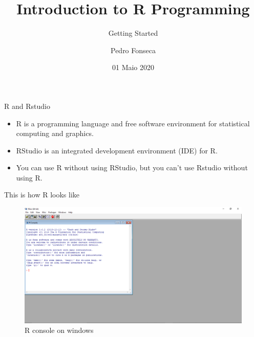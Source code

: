 \documentclass[ignorenonframetext,]{beamer}
\title{Introduction to R Programming}
\subtitle{Getting Started}
\author{Pedro Fonseca}
\date{01 Maio 2020}
\providecommand{\tightlist}{%
  \setlength{\itemsep}{0pt}\setlength{\parskip}{0pt}}
\begin{document}
\frame{\titlepage}

\begin{frame}{R and Rstudio}
\protect\hypertarget{r-and-rstudio}{}

\begin{itemize}
\tightlist
\item
  R is a programming language and free software environment for
  statistical computing and graphics.
\item
  RStudio is an integrated development environment (IDE) for R.
\item
  You can use R without using RStudio, but you can't use Rstudio without
  using R.
\end{itemize}

\end{frame}

\begin{frame}{This is how R looks like}
\protect\hypertarget{this-is-how-r-looks-like}{}

\begin{figure}
\includegraphics[scale = .3]{figures/Screenshot_1}
\caption{R console on windows}
\end{figure}

\end{frame}
\end{document}
